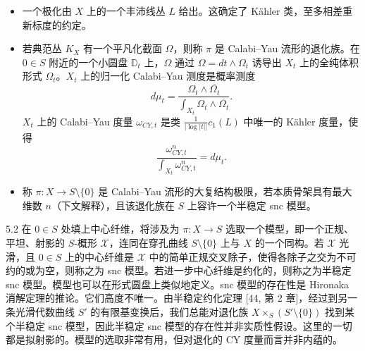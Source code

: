 \begin{itemize}
\item 一个极化由 $X$ 上的一个丰沛线丛 $L$ 给出。这确定了 Kähler 类，至多相差重新标度的约定。
\item 若典范丛 $K_X$ 有一个平凡化截面 $\Omega$，则称 $\pi$ 是 Calabi--Yau 流形的退化族。在 $0\in S$ 附近的一个小圆盘 $\mathbb{D}_t$ 上，$\Omega$ 通过 $\Omega=dt\wedge\Omega_t$ 诱导出 $X_t$ 上的全纯体积形式 $\Omega_t$。$X_t$ 上的归一化 Calabi--Yau 测度是概率测度
\begin{equation}
d\mu_t = \frac{\Omega_t\wedge\overline{\Omega_t}}{\int_{X_t}\Omega_t\wedge\overline{\Omega_t}}. \tag{5.5}
\end{equation}
$X_t$ 上的 Calabi--Yau 度量 $\omega_{CY,t}$ 是类 $\frac{1}{|\log|t||}c_1(L)$ 中唯一的 Kähler 度量，使得
\begin{equation}
\frac{\omega_{CY,t}^n}{\int_{X_t}\omega_{CY,t}^n} = d\mu_t. \tag{5.6}
\end{equation}
\item 称 $\pi:X\to S\setminus\{0\}$ 是 Calabi--Yau 流形的大复结构极限，若本质骨架具有最大维数 $n$（下文解释），且该退化族在 $S$ 上容许一个半稳定 snc 模型。
\end{itemize}



\begin{remark}{5.2}
在 $0\in S$ 处填上中心纤维，将涉及为 $\pi:X\to S$ 选取一个模型，即一个正规、平坦、射影的 $S$-概形 $\mathcal{X}$，连同在穿孔曲线 $S\setminus\{0\}$ 上与 $X$ 的一个同构。若 $\mathcal{X}$ 光滑，且 $0\in S$ 上的中心纤维是 $\mathcal{X}$ 中的简单正规交叉除子，使得各除子之交为不可约的或为空，则称之为 snc 模型。若进一步中心纤维是约化的，则称之为半稳定 snc 模型。模型也可以在形式圆盘上类似地定义。snc 模型的存在性是 Hironaka 消解定理的推论。它们高度不唯一。由半稳定约化定理 [44, 第 2 章]，经过到另一条光滑代数曲线 $S'$ 的有限基变换后，我们总能对退化族 $X\times_S(S'\setminus\{0\})$ 找到某个半稳定 snc 模型，因此半稳定 snc 模型的存在性并非实质性假设。这里的一切都是拟射影的。模型的选取非常有用，但对退化的 CY 度量而言并非内蕴的。
\end{remark}

